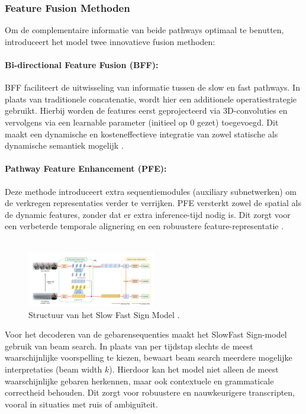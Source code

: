 \subsubsection{Feature Fusion Methoden}
Om de complementaire informatie van beide pathways optimaal te benutten, introduceert het model twee innovatieve fusion methoden:
\paragraph{Bi-directional Feature Fusion (BFF):}
BFF faciliteert de uitwisseling van informatie tussen de slow en fast pathways. 
In plaats van traditionele concatenatie, wordt hier een additionele operatiestrategie gebruikt. 
Hierbij worden de features eerst geprojecteerd via 3D-convoluties en vervolgens via een learnable parameter (initieel op 0 gezet) toegevoegd. 
Dit maakt een dynamische en kosteneffectieve integratie van zowel statische als dynamische semantiek mogelijk \autocite{10445841}.
\paragraph{Pathway Feature Enhancement (PFE):}
Deze methode introduceert extra sequentiemodules (auxiliary subnetwerken) om de verkregen representaties verder te verrijken. 
PFE versterkt zowel de spatial als de dynamic features, zonder dat er extra inference-tijd nodig is. 
Dit zorgt voor een verbeterde temporale alignering en een robuustere feature-representatie \autocite{10445841}.
\\
\\
\begin{figure}[h!]
  \includegraphics[width=0.5\textwidth]{../graphics/structuurSlowFast.png}
  \caption{Structuur van het Slow Fast Sign Model \autocite{10445841}.}
  \label{fig:structuur_slowFast}
\end{figure}

Voor het decoderen van de gebarensequenties maakt het SlowFast Sign-model gebruik van beam search. 
In plaats van per tijdstap slechts de meest waarschijnlijke voorspelling te kiezen, bewaart beam search meerdere mogelijke interpretaties (beam width $k$). 
Hierdoor kan het model niet alleen de meest waarschijnlijke gebaren herkennen, maar ook contextuele en grammaticale correctheid behouden. 
Dit zorgt voor robuustere en nauwkeurigere transcripten, vooral in situaties met ruis of ambiguïteit\autocite{10445841}.

